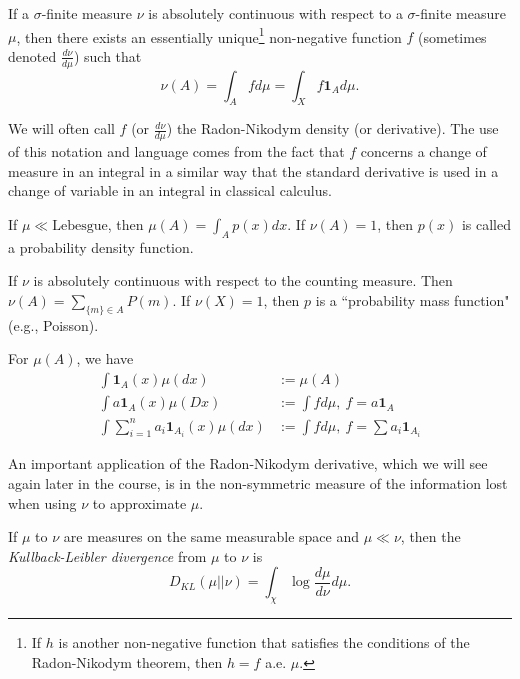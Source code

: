 \documentclass[twoside]{article}
\begin{document}
\begin{theorem}\citep[Def. 1.10, p.~7]{keener}
  If a $\sigma$-finite measure $\nu$ is absolutely continuous with respect to a
  $\sigma$-finite measure $\mu$, then there exists an essentially unique\footnote{If $h$ is
  another non-negative function that satisfies the conditions of the Radon-Nikodym theorem,
  then $h=f$ a.e. $\mu$.} non-negative function $f$
  (sometimes denoted $\frac{d\nu}{d\mu}$) such that
  \[\nu(A) = \int_A f d\mu = \int_X f \mathbf{1}_A d\mu.\]
\end{theorem}

We will often call $f$ (or $\frac{d\nu}{d\mu}$) the Radon-Nikodym density (or
derivative).  The use of this notation and language comes from the fact that
$f$ concerns a change of measure in an integral in a similar way that the
standard derivative is used in a change of variable in an integral in classical
calculus. 

\begin{example}
  If $\mu \ll \text{Lebesgue}$, then $\mu(A) = \int_A p(x) dx$.  If $\nu(A) =
  1$, then $p(x)$ is called a probability density function.
\end{example}

\begin{example}
  If $\nu$ is absolutely continuous with respect to the counting measure. Then $\nu(A)
  = \sum_{\{m\} \in A} P(m)$.  If $\nu(X) = 1$, then $p$ is a ``probability mass
  function" (e.g., Poisson).
\end{example}

For $\mu(A)$, we have
\begin{align*}
   \int \mathbf{1}_A(x) \mu(dx) &:= \mu(A) \\
   \int a \mathbf{1}_A(x) \mu(Dx) &:= \int f d\mu,\ f = a \mathbf{1}_A \\
   \int \sum_{i=1}^n a_i \mathbf{1}_{A_i}(x) \mu(dx) &:= \int f d\mu,\ f = \sum
   a_i \mathbf{1}_{A_i}
\end{align*}

An important application of the Radon-Nikodym derivative, which we will see
again later in the course, is in the non-symmetric measure of the information
lost when using $\nu$ to approximate $\mu$.

\begin{definition}
  If  $\mu$ to $\nu$ are measures on the same measurable space and
  $\mu \ll \nu$, then the \emph{Kullback-Leibler divergence} from
  $\mu$ to $\nu$ is
  \[ D_{KL}(\mu || \nu) = \int_\chi \log \frac{d\mu}{d\nu} d\mu. \]
\end{definition}
\end{document}
